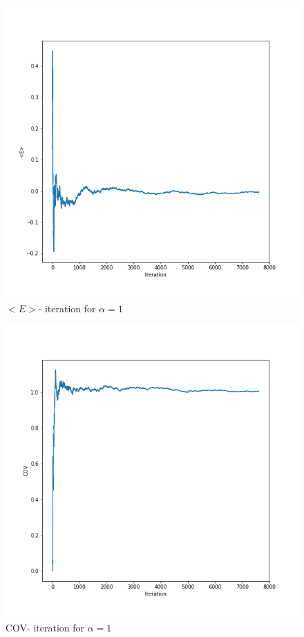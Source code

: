 \documentclass{article}
\begin{document}
\begin{figure}[h!]
\centering
\includegraphics[scale=0.4]{h4p1b1.png}
\caption{$<E>$- iteration for $\alpha = 1$}
\end{figure}

\begin{figure}[h!]
\centering
\includegraphics[scale=0.4]{h4p1b2.png}
\caption{COV- iteration for $\alpha = 1$}
\end{figure}
\end{document}
